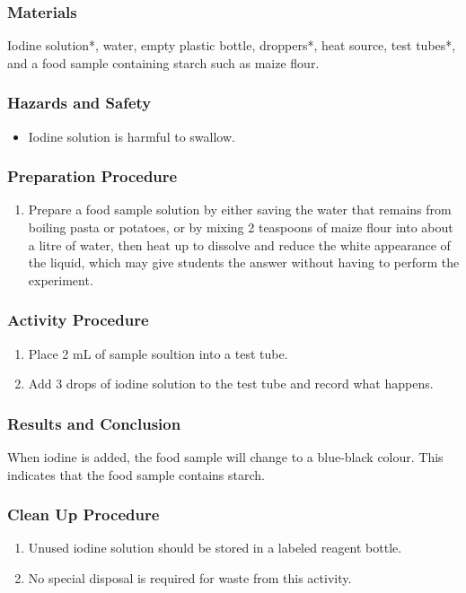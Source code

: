 \subsubsection*{Materials}
Iodine solution*, water, empty plastic bottle, droppers*, heat source, test tubes*, and a food sample containing starch such as maize flour.

\subsubsection*{Hazards and Safety}
\begin{itemize}
\item{Iodine solution is harmful to swallow.}
\end{itemize}

\subsubsection*{Preparation Procedure}
\begin{enumerate}
\item{Prepare a food sample solution by either saving the water that remains from boiling pasta or potatoes, or by mixing 2 teaspoons of maize flour into about a litre of water, then heat up to dissolve and reduce the white appearance of the liquid, which may give students the answer without having to perform the experiment.}
\end{enumerate}

\subsubsection*{Activity Procedure}
\begin{enumerate}
\item{Place 2 mL of sample soultion into a test tube.}
\item{Add 3 drops of iodine solution to the test tube and record what happens.}
\end{enumerate}

\subsubsection*{Results and Conclusion}
When iodine is added, the food sample will change to a blue-black colour. This indicates that the food sample contains starch.

\subsubsection*{Clean Up Procedure}
\begin{enumerate}
\item{Unused iodine solution should be stored in a labeled reagent bottle.}
\item{No special disposal is required for waste from this activity.}
\end{enumerate}

